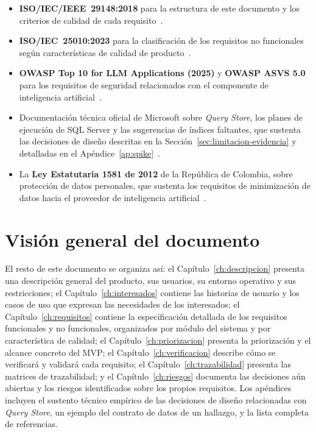 \documentclass[11pt,a4paper]{report}
\begin{document}
\begin{itemize}
\item \textbf{ISO/IEC/IEEE~29148:2018} para la estructura de este documento y los criterios de calidad de cada requisito~\cite{R1}.
\item \textbf{ISO/IEC~25010:2023} para la clasificaci\'on de los requisitos no funcionales seg\'un caracter\'isticas de calidad de producto~\cite{R2}.
\item \textbf{OWASP Top 10 for LLM Applications (2025)} y \textbf{OWASP ASVS 5.0} para los requisitos de seguridad relacionados con el componente de inteligencia artificial~\cite{R12,R13}.
\item Documentaci\'on t\'ecnica oficial de Microsoft sobre \textit{Query Store}, los planes de ejecuci\'on de SQL Server y las sugerencias de \'indices faltantes, que sustenta las decisiones de dise\~no descritas en la Secci\'on~\ref{sec:limitacion-evidencia} y detalladas en el Ap\'endice~\ref{ap:spike}~\cite{R3,R4,R5,R6,R7,R8,R9,R10,R11,R30}.
\item La \textbf{Ley Estatutaria 1581 de 2012} de la Rep\'ublica de Colombia, sobre protecci\'on de datos personales, que sustenta los requisitos de minimizaci\'on de datos hacia el proveedor de inteligencia artificial~\cite{R14}.
\end{itemize}

\section{Visi\'on general del documento}

El resto de este documento se organiza as\'i: el Cap\'itulo~\ref{ch:descripcion} presenta una descripci\'on general del producto, sus usuarios, su entorno operativo y sus restricciones; el Cap\'itulo~\ref{ch:interesados} contiene las historias de usuario y los casos de uso que expresan las necesidades de los interesados; el Cap\'itulo~\ref{ch:requisitos} contiene la especificaci\'on detallada de los requisitos funcionales y no funcionales, organizados por m\'odulo del sistema y por caracter\'istica de calidad; el Cap\'itulo~\ref{ch:priorizacion} presenta la priorizaci\'on y el alcance concreto del MVP; el Cap\'itulo~\ref{ch:verificacion} describe c\'omo se verificar\'a y validar\'a cada requisito; el Cap\'itulo~\ref{ch:trazabilidad} presenta las matrices de trazabilidad; y el Cap\'itulo~\ref{ch:riesgos} documenta las decisiones a\'un abiertas y los riesgos identificados sobre los propios requisitos. Los ap\'endices incluyen el sustento t\'ecnico emp\'irico de las decisiones de dise\~no relacionadas con \textit{Query Store}, un ejemplo del contrato de datos de un hallazgo, y la lista completa de referencias.
\end{document}
